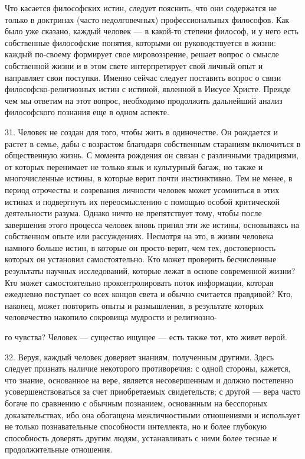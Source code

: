 \documentclass[a5paper,10pt]{article}
\begin{document}
Что касается философских истин, следует пояснить, что они содержатся не только
в доктринах (часто недолговечных) профессиональных философов. Как было уже
сказано, каждый человек — в какой-то степени философ, и у него есть собственные
философские понятия, которыми он руководствуется в жизни: каждый по-своему
формирует свое мировоззрение, решает вопрос о смысле собственной жизни и в этом
свете интерпретирует свой личный опыт и направляет свои поступки. Именно сейчас
следует поставить вопрос о связи философско-религиозных истин с истиной,
явленной в Иисусе Христе. Прежде чем мы ответим на этот вопрос, необходимо
продолжить дальнейший анализ философского познания еще в одном аспекте.

31. Человек не создан для того, чтобы жить в одиночестве. Он рождается и растет
в семье, дабы с возрастом благодаря собственным стараниям включиться в
общественную жизнь. С момента рождения он связан с различными традициями, от
которых перенимает не только язык и культурный багаж, но также и многочисленные
истины, в которые верит почти инстинктивно. Тем не менее, в период отрочества и
созревания личности человек может усомниться в этих истинах и подвергнуть их
переосмыслению с помощью особой критической деятельности разума. Однако ничто
не препятствует тому, чтобы после завершения этого процесса человек вновь
принял эти же истины, основываясь на собственном опыте или рассуждениях.
Несмотря на это, в жизни человека намного больше истин, в которые он просто
верит, чем тех, достоверность которых он установил самостоятельно. Кто может
проверить бесчисленные результаты научных исследований, которые лежат в основе
современной жизни? Кто может самостоятельно проконтролировать поток информации,
которая ежедневно поступает со всех концов света и обычно считается правдивой?
Кто, наконец, может повторить опыты и размышления, в результате которых
человечество накопило сокровища мудрости и религиозно-

го чувства? Человек — существо ищущее — есть также тот, кто живет верой.

32. Веруя, каждый человек доверяет знаниям, полученным другими. Здесь следует
признать наличие некоторого противоречия: с одной стороны, кажется, что знание,
основанное на вере, является несовершенным и должно постепенно
усовершенствоваться за счет приобретаемых свидетельств; с другой — вера часто
богаче по сравнению с обычным познанием, основанным на бесспорных
доказательствах, ибо она обогащена межличностными отношениями и использует не
только познавательные способности интеллекта, но и более глубокую способность
доверять другим людям, устанавливать с ними более тесные и продолжительные
отношения.
\end{document}
